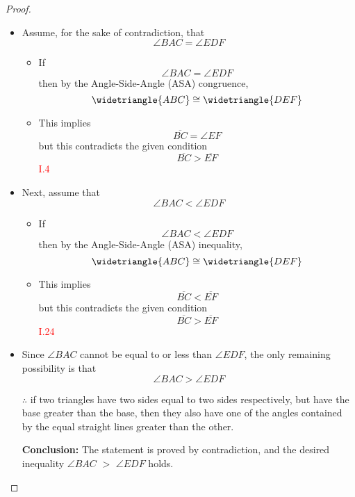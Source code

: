 \begin{proof}

\begin{itemize}

\item[]

\item Assume, for the sake of contradiction, that 
\[\angle{BAC} = \angle{EDF}\]
   \begin{itemize}
     \item If 
     \[\angle{BAC} = \angle{EDF}\] 
     then by the Angle-Side-Angle (ASA) congruence,  
     \[\widetriangle{ABC} \cong \widetriangle{DEF}\] 
 
 \clearpage
     
     \item This implies 
     \[\overline{BC} = \angle{EF}\]
      but this contradicts the given condition 
      \[\overline{BC} > \overline{EF}\]\hfill\textcolor{red}{I.4}
   \end{itemize}

\item Next, assume that 
\[\angle{BAC} < \angle{EDF}\]
   \begin{itemize}
     \item If
     \[ \angle{BAC} < \angle{EDF}\]
      then by the Angle-Side-Angle (ASA) inequality, 
      \[\widetriangle{ABC} \cong \widetriangle{DEF}\] 
      
     \item This implies 
     \[\overline{BC} < \overline{EF}\] 
     but this contradicts the given condition 
     \[\overline{BC} > \overline{EF}\]\hfill\textcolor{red}{I.24}
   \end{itemize}

\item Since $\angle{BAC}$ cannot be equal to or less than $\angle{EDF}$, the only remaining possibility is that 
\[\angle{BAC} > \angle{EDF}\]

\clearpage

\item[$\therefore$] if two triangles have two sides equal to two sides respectively, but have the base greater than the base, then they also have one of the angles contained by the equal straight lines greater than the other.

\textbf{Conclusion:} The statement is proved by contradiction, and the desired inequality $\angle{BAC}$ $>$ $\angle{EDF}$ holds. 

\end{itemize}

\end{proof}

\clearpage
